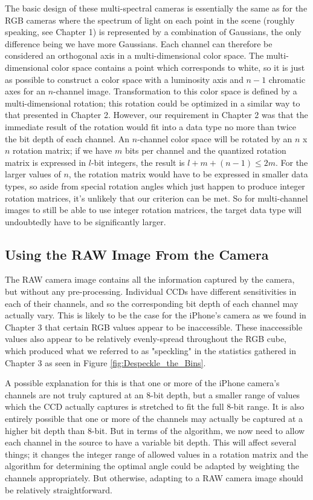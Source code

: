 The basic design of these multi-spectral cameras is essentially the same as for the RGB cameras where the spectrum of light on each point in the scene (roughly speaking, see Chapter 1) is represented by a combination of Gaussians, the only difference being we have more Gaussians. Each channel can therefore be considered an orthogonal axis in a multi-dimensional color space. The multi-dimensional color space contains a point which corresponds to white, so it is just as possible to construct a color space with a luminosity axis and $n-1$ chromatic axes for an $n$-channel image. Transformation to this color space is defined by a multi-dimensional rotation; this rotation could be optimized in a similar way to that presented in Chapter 2. However, our requirement in Chapter 2 was that the immediate result of the rotation would fit into a data type no more than twice the bit depth of each channel. An $n$-channel color space will be rotated by an $n$ x $n$ rotation matrix; if we have $m$ bits per channel and the quantized rotation matrix is expressed in $l$-bit integers, the result is $l + m + (n-1) \leqslant 2m$. For the larger values of $n$, the rotation matrix would have to be expressed in smaller data types, so aside from special rotation angles which just happen to produce integer rotation matrices, it's unlikely that our criterion can be met. So for multi-channel images to still be able to use integer rotation matrices, the target data type will undoubtedly have to be significantly larger. 

\subsection{Using the RAW Image From the Camera}\label{sec:UsingTheRAWImageFromTheCamera}
The RAW camera image contains all the information captured by the camera, but without any pre-processing. Individual CCDs have different sensitivities in each of their channels, and so the corresponding bit depth of each channel may actually vary. This is likely to be the case for the iPhone's camera as we found in Chapter 3 that certain RGB values appear to be inaccessible. These inaccessible values also appear to be relatively evenly-spread throughout the RGB cube, which produced what we referred to as "speckling" in the statistics gathered in Chapter 3 as seen in Figure \ref{fig:Despeckle_the_Bins}. 

A possible explanation for this is that one or more of the iPhone camera's channels are not truly captured at an 8-bit depth, but a smaller range of values which the CCD actually captures is stretched to fit the full 8-bit range. It is also entirely possible that one or more of the channels may actually be captured at a higher bit depth than 8-bit. But in terms of the algorithm, we now need to allow each channel in the source to have a variable bit depth. This will affect several things; it changes the integer range of allowed values in a rotation matrix and the algorithm for determining the optimal angle could be adapted by weighting the channels appropriately. But otherwise, adapting to a RAW camera image should be relatively straightforward.

